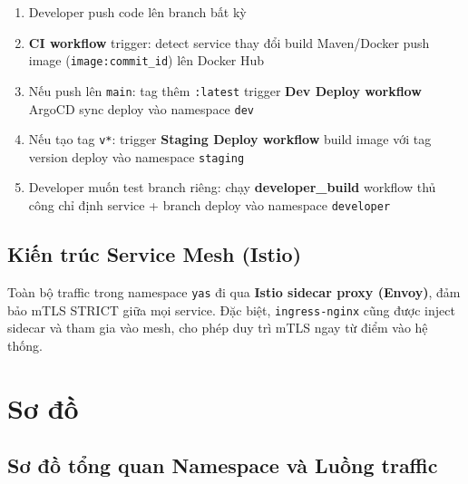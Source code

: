 \begin{tcolorbox}[colback=gray!10, colframe=codeblue, title=Luồng CI/CD Pipeline]
  \small
  \begin{enumerate}[leftmargin=*]
    \item Developer push code lên branch bất kỳ
    \item \textbf{CI workflow} trigger: detect service thay đổi \textrightarrow{} build Maven/Docker \textrightarrow{} push image
          (\texttt{image:commit\_id}) lên Docker Hub
    \item Nếu push lên \texttt{main}: tag thêm \texttt{:latest} \textrightarrow{} trigger \textbf{Dev Deploy workflow}
          \textrightarrow{} ArgoCD sync \textrightarrow{} deploy vào namespace \texttt{dev}
    \item Nếu tạo tag \texttt{v*}: trigger \textbf{Staging Deploy workflow} \textrightarrow{} build image với tag version
          \textrightarrow{} deploy vào namespace \texttt{staging}
    \item Developer muốn test branch riêng: chạy \textbf{developer\_build} workflow thủ công
          \textrightarrow{} chỉ định service + branch \textrightarrow{} deploy vào namespace \texttt{developer}
  \end{enumerate}
\end{tcolorbox}

\subsection{Kiến trúc Service Mesh (Istio)}

Toàn bộ traffic trong namespace \texttt{yas} đi qua \textbf{Istio sidecar proxy (Envoy)},
đảm bảo mTLS STRICT giữa mọi service. Đặc biệt, \texttt{ingress-nginx} cũng được
inject sidecar và tham gia vào mesh, cho phép duy trì mTLS ngay từ điểm vào hệ thống.

\section{Sơ đồ}

\subsection{Sơ đồ tổng quan Namespace và Luồng traffic}


